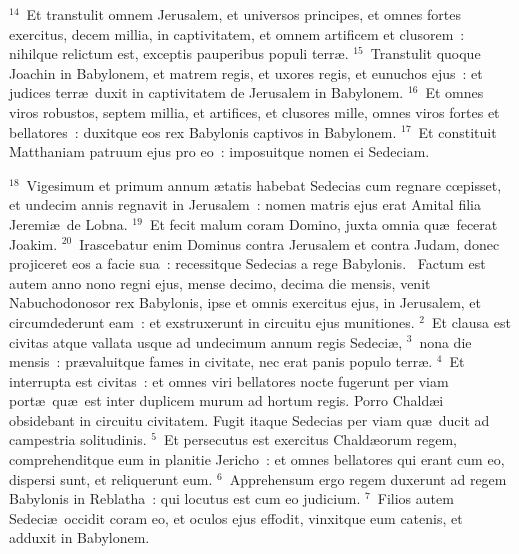 ${}^{14}$~Et transtulit omnem Jerusalem, et universos principes, et omnes fortes exercitus, decem millia, in captivitatem, et omnem artificem et clusorem~: nihilque relictum est, exceptis pauperibus populi terr\ae .
${}^{15}$~Transtulit quoque Joachin in Babylonem, et matrem regis, et uxores regis, et eunuchos ejus~: et judices terr\ae\ duxit in captivitatem de Jerusalem in Babylonem.
${}^{16}$~Et omnes viros robustos, septem millia, et artifices, et clusores mille, omnes viros fortes et bellatores~: duxitque eos rex Babylonis captivos in Babylonem.
${}^{17}$~Et constituit Matthaniam patruum ejus pro eo~: imposuitque nomen ei Sedeciam.


${}^{18}$~Vigesimum et primum annum \ae tatis habebat Sedecias cum regnare cœpisset, et undecim annis regnavit in Jerusalem~: nomen matris ejus erat Amital filia Jeremi\ae\ de Lobna.
${}^{19}$~Et fecit malum coram Domino, juxta omnia qu\ae\ fecerat Joakim.
${}^{20}$~Irascebatur enim Dominus contra Jerusalem et contra Judam, donec projiceret eos a facie sua~: recessitque Sedecias a rege Babylonis.
~\lettrine[lines=10,image=true,loversize=0.05,lraise=-0.03]{F}{}actum est autem anno nono regni ejus, mense decimo, decima die mensis, venit Nabuchodonosor rex Babylonis, ipse et omnis exercitus ejus, in Jerusalem, et circumdederunt eam~: et exstruxerunt in circuitu ejus munitiones.
${}^{2}$~Et clausa est civitas atque vallata usque ad undecimum annum regis Sedeci\ae ,
${}^{3}$~nona die mensis~: pr\ae valuitque fames in civitate, nec erat panis populo terr\ae .
${}^{4}$~Et interrupta est civitas~: et omnes viri bellatores nocte fugerunt per viam port\ae\ qu\ae\ est inter duplicem murum ad hortum regis. Porro Chald\ae i obsidebant in circuitu civitatem. Fugit itaque Sedecias per viam qu\ae\ ducit ad campestria solitudinis.
${}^{5}$~Et persecutus est exercitus Chald\ae orum regem, comprehenditque eum in planitie Jericho~: et omnes bellatores qui erant cum eo, dispersi sunt, et reliquerunt eum.
${}^{6}$~Apprehensum ergo regem duxerunt ad regem Babylonis in Reblatha~: qui locutus est cum eo judicium.
${}^{7}$~Filios autem Sedeci\ae\ occidit coram eo, et oculos ejus effodit, vinxitque eum catenis, et adduxit in Babylonem.


